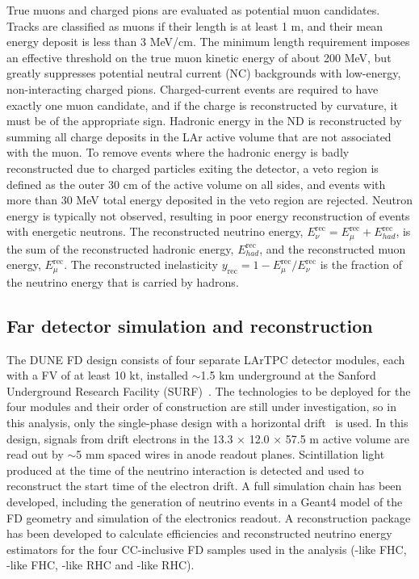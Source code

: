 True muons and charged pions are evaluated as potential muon candidates. Tracks are classified as muons if their length is at least 1 m, and their mean energy deposit is less than 3 MeV/cm. The minimum length requirement imposes an effective threshold on the true muon kinetic energy of about 200 MeV, but greatly suppresses potential neutral current (NC) backgrounds with low-energy, non-interacting charged pions. Charged-current events are required to have exactly one muon candidate, and if the charge is reconstructed by curvature, it must be of the appropriate sign. Hadronic energy in the ND is reconstructed by summing all charge deposits in the LAr active volume that are not associated with the muon. To remove events where the hadronic energy is badly reconstructed due to charged particles exiting the detector, a veto region is defined as the outer 30 cm of the active volume on all sides, and events with more than 30 MeV total energy deposited in the veto region are rejected. Neutron energy is typically not observed, resulting in poor energy reconstruction of events with energetic neutrons. The reconstructed neutrino energy, $E_{\nu}^{\mathrm{rec}} = E_{\mu}^{\mathrm{rec}} + E_{had}^{\mathrm{rec}}$, is the sum of the reconstructed hadronic energy, $E_{had}^{\mathrm{rec}}$, and the reconstructed muon energy, $E_{\mu}^{\mathrm{rec}}$. The reconstructed inelasticity $y_{\mathrm{rec}} = 1 - E_{\mu}^{\mathrm{rec}}/E_{\nu}^{\mathrm{rec}}$ is the fraction of the neutrino energy that is carried by hadrons.

\subsection{Far detector simulation and reconstruction}
\label{sec:fd}
The DUNE FD design consists of four separate LArTPC detector modules, each with a FV of at least 10 kt, installed $\sim$1.5 km underground at the Sanford Underground Research Facility (SURF)~\cite{Abi:2018dnh}. The technologies to be deployed for the four modules and their order of construction are still under investigation, so in this analysis, only the single-phase design with a horizontal drift~\cite{Abi:2020loh} is used. In this design, signals from drift electrons in the 13.3 $\times$ 12.0 $\times$ 57.5 m active volume are read out by $\sim$5 mm spaced wires in anode readout planes. Scintillation light produced at the time of the neutrino interaction is detected and used to reconstruct the start time of the electron drift. A full simulation chain has been developed, including the generation of neutrino events in a Geant4 model of the FD geometry and simulation of the electronics readout. A reconstruction package has been developed to calculate efficiencies and reconstructed neutrino energy estimators for the four CC-inclusive FD samples used in the analysis (\numu-like FHC, \nue-like FHC, \anumu-like RHC and \anue-like RHC).

